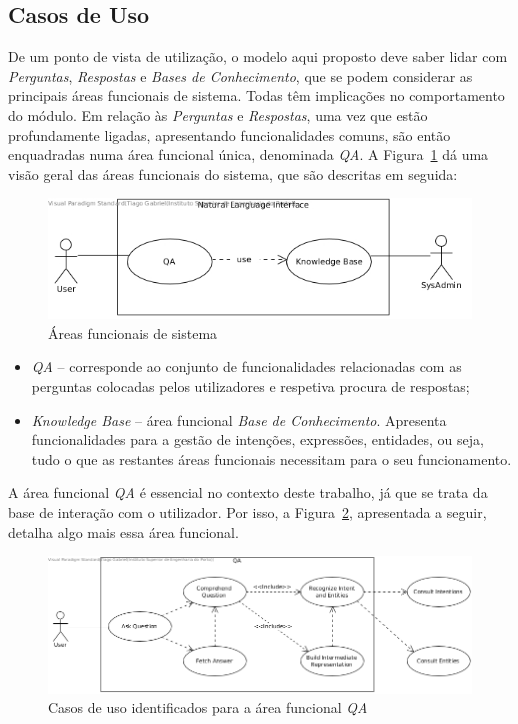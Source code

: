 \subsection{Casos de Uso}
De um ponto de vista de utilização, o modelo aqui proposto deve saber lidar com \textit{Perguntas}, \textit{Respostas} e \textit{Bases de Conhecimento}, que se podem considerar as principais áreas funcionais de sistema. Todas têm implicações no comportamento do módulo. Em relação às \textit{Perguntas} e \textit{Respostas}, uma vez que estão profundamente ligadas, apresentando funcionalidades comuns, são então enquadradas numa área funcional única, denominada \textit{QA}. A Figura~\ref{fig:use_cases} dá uma visão geral das áreas funcionais do sistema, que são descritas em seguida:
%
\begin{figure}
    \centering
    \includegraphics[width=.72\textwidth]{ch04/assets/use-cases.jpg}
    \caption{Áreas funcionais de sistema}
    \label{fig:use_cases}
\end{figure}
%
\begin{itemize}
    \item 
    {
        \textit{QA} -- corresponde ao conjunto de funcionalidades relacionadas com as perguntas colocadas pelos utilizadores e respetiva procura de respostas;
    }
    \item 
    {
        \textit{Knowledge Base} -- área funcional \textit{Base de Conhecimento}. Apresenta funcionalidades para a gestão de intenções, expressões, entidades, ou seja, tudo o que as restantes áreas funcionais necessitam para o seu funcionamento.
    }
\end{itemize}

A área funcional \textit{QA} é essencial no contexto deste trabalho, já que se trata da base de interação com o utilizador. Por isso, a Figura~\ref{fig:detailed_use_cases}, apresentada a seguir, detalha algo mais essa área funcional.
%
\begin{figure}[!ht]
    \centering
    \includegraphics[width=.93\textwidth]{ch04/assets/questions-use-cases.jpg}
    \caption{Casos de uso identificados para a área funcional \textit{QA}}
    \label{fig:detailed_use_cases}
\end{figure}

